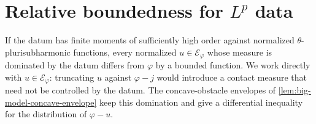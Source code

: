 \section{Relative boundedness for \texorpdfstring{$L^p$}{Lp} data}
\label{sec:big-model-lp}

If the datum has finite moments of sufficiently high order against normalized $\theta$-plurisubharmonic functions, every normalized $u\in\mathcal E_\varphi$ whose measure is dominated by the datum differs from $\varphi$ by a bounded function. We work directly with $u\in\mathcal E_\varphi$: truncating $u$ against $\varphi-j$ would introduce a contact measure that need not be controlled by the datum. The concave-obstacle envelopes of \cref{lem:big-model-concave-envelope} keep this domination and give a differential inequality for the distribution of $\varphi-u$.


